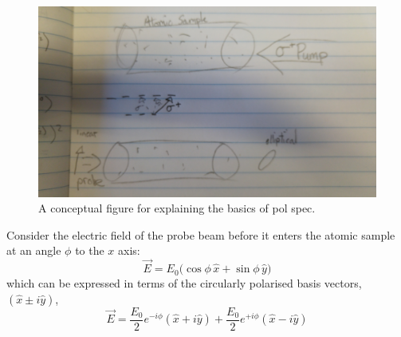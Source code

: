 \begin{figure}
\centering
\includegraphics[width=\linewidth,angle=180]{part1/Figs/pol_spec_explanation_placeholder.jpg}
\caption{A conceptual figure for explaining the basics of pol spec.}
\label{figure:pol_spec_explanation}
\end{figure}

Consider the electric field of the probe beam before it enters the atomic sample at an angle $\phi$ to the $x$ axis:
\begin{equation}
\vec{E}=E_0\big(\cos{\phi}\,\hat{x}+\sin{\phi}\,\hat{y}\big)
\end{equation}
which can be expressed in terms of the circularly polarised basis vectors, $(\hat{x}\pm i\hat{y})$,
\begin{equation}
\vec{E} = \frac{E_0}{2}e^{-i\phi}(\hat{x}+i\hat{y}) + \frac{E_0}{2}e^{+i\phi}(\hat{x}-i\hat{y})
\end{equation}

